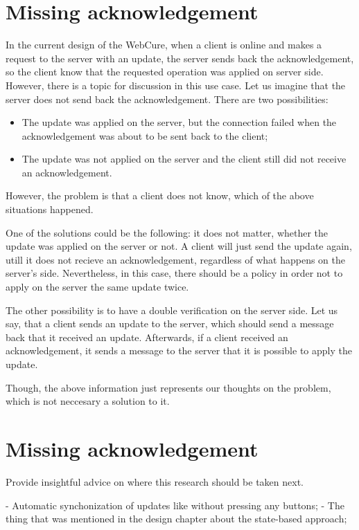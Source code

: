 \section*{Missing acknowledgement}

In the current design of the WebCure, when a client is online and makes a request to the server with an update, the server sends back the acknowledgement, so the client know that the requested operation was applied on server side. However, there is a topic for discussion in this use case. Let us imagine that the server does not send back the acknowledgement. There are two possibilities:

\begin{itemize}
    \item {The update was applied on the server, but the connection failed when the acknowledgement was about to be sent back to the client;}
    \item {The update was not applied on the server and the client still did not receive an acknowledgement.}
\end{itemize}

However, the problem is that a client does not know, which of the above situations happened. 

One of the solutions could be the following: it does not matter, whether the update was applied on the server or not. A client will just send the update again, utill it does not recieve an acknowledgement, regardless of what happens on the server's side. Nevertheless, in this case, there should be a policy in order not to apply on the server the same update twice.

The other possibility is to have a double verification on the server side. Let us say, that a client sends an update to the server, which should send a message back that it received an update. Afterwards, if a client received an acknowledgement, it sends a message to the server that it is possible to apply the update. 

Though, the above information just  represents our thoughts on the problem, which is not neccesary a solution to it.  

\section*{Missing acknowledgement}

Provide insightful advice on where this research should be taken next.

- Automatic synchonization of updates like without pressing any buttons;
- The thing that was mentioned in the design chapter about the state-based approach;

